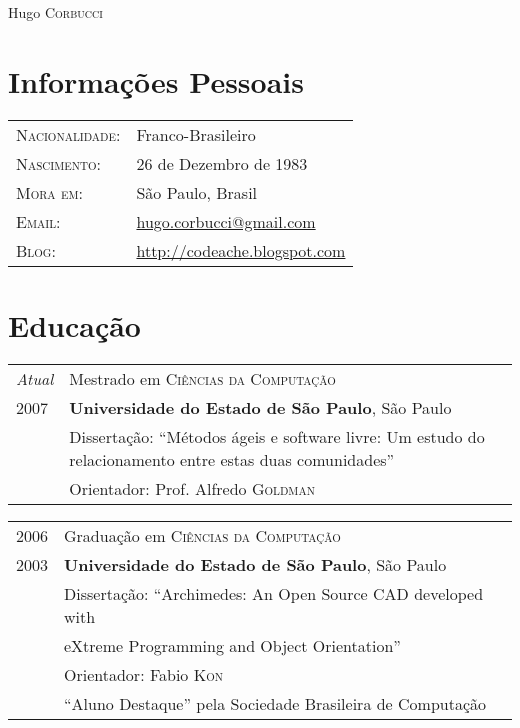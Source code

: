 \documentclass[letter,10pt]{article}
\begin{document}
\par{\centering
		{\Huge Hugo \textsc{Corbucci}
	}\bigskip\par}

\section{Informações Pessoais}

\begin{tabular}{p{2.5cm}l}
    \textsc{Nacionalidade:} & Franco-Brasileiro
    \\
    \textsc{Nascimento:} & 26 de Dezembro de 1983\\
    \textsc{Mora em:}   & São Paulo, Brasil \\
    \textsc{Email:}     &
    \href{mailto:hugo.corbucci@gmail.com}{hugo.corbucci@gmail.com}\\
    \textsc{Blog:}     &
    \href{http://codeache.blogspot.com}{http://codeache.blogspot.com}
\end{tabular}

\section{Educação}
\begin{tabular}{p{2.5cm}l}
  \emph{Atual} & Mestrado em \textsc{Ciências da Computação}\\
  \textsc{2007} & \textbf{Universidade do Estado de São Paulo}, São Paulo\\
  & Dissertação: ``Métodos ágeis e software livre: Um estudo do relacionamento entre estas duas comunidades''\\
  & \small Orientador: Prof. Alfredo \textsc{Goldman}\\
\end{tabular}

\begin{tabular}{p{2.5cm}l}
  \textsc{2006} & Graduação em \textsc{Ciências da Computação}\\
  \textsc{2003} &\normalsize\textbf{Universidade do Estado de São Paulo}, São Paulo\\
  & Dissertação: ``Archimedes: An Open Source CAD developed with\\
  & eXtreme Programming and Object Orientation''\\
  & \small Orientador: Fabio \textsc{Kon}\\
  & ``Aluno Destaque'' pela Sociedade Brasileira de Computação\\
\end{tabular}
\end{document}

